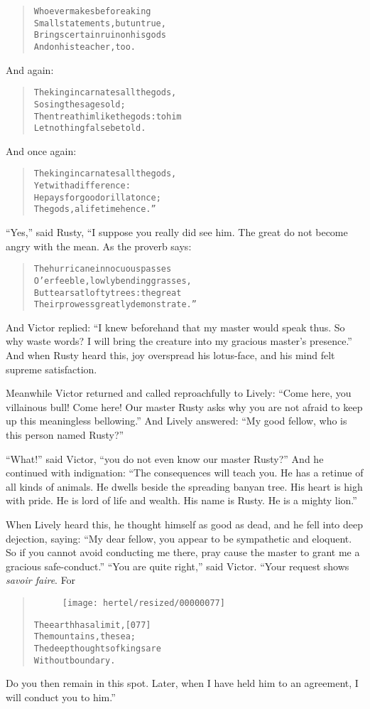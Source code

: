 \documentclass[article, twoside, 10pt]{memoir}
\renewenvironment{verbatim}{%
\begin{quote}%
\vskip -10pt%
\begin{alltt}\normalfont\small}{\end{alltt}%
\end{quote}%
\vskip -10pt
} %
\begin{document}
\begin{verbatim}
Whoever makes before a king
    Small statements, but untrue,
Brings certain ruin on his gods
    And on his teacher, too.
\end{verbatim}
And again:

\begin{verbatim}
The king incarnates all the gods,
    So sing the sages old;
Then treat him like the gods: to him
    Let nothing false be told.
\end{verbatim}
And once again:

\begin{verbatim}
The king incarnates all the gods,
    Yet with a difference:
He pays for good or ill at once;
    The gods, a lifetime hence.”
\end{verbatim}
``Yes,'' said Rusty, “I suppose you really did see him. The great
do not become angry with the mean. As the proverb says:

\begin{verbatim}
The hurricane innocuous passes
O'er feeble, lowly bending grasses,
But tears at lofty trees: the great
Their prowess greatly demonstrate.”
\end{verbatim}
And Victor replied:
``I knew beforehand that my master would speak thus. So why waste words? I will bring the creature into my gracious master's presence.''
And when Rusty heard this, joy overspread his lotus-face, and his
mind felt supreme satisfaction.

Meanwhile Victor returned and called reproachfully to Lively:
``Come here, you villainous bull! Come here! Our master Rusty asks why you are not afraid to keep up this meaningless bellowing.''
And Lively answered:
``My good fellow, who is this person named Rusty?''

``What!'' said Victor, ``you do not even know our master Rusty?''
And he continued with indignation:
``The consequences will teach you. He has a retinue of all kinds of animals. He dwells beside the spreading banyan tree. His heart is high with pride. He is lord of life and wealth. His name is Rusty. He is a mighty lion.''

When Lively heard this, he thought himself as good as dead, and he
fell into deep dejection, saying:
``My dear fellow, you appear to be sympathetic and eloquent. So if you cannot avoid conducting me there, pray cause the master to grant me a gracious safe-conduct.''
``You are quite right,'' said Victor. “Your request shows
\emph{savoir faire}. For

\begin{verbatim}
\begin{figure}[p]\texttt{[image: hertel/resized/00000077]}\end{figure}The earth has a limit,                                  [077]
    The mountains, the sea;
The deep thoughts of kings are
    Without boundary.
\end{verbatim}
Do you then remain in this spot. Later, when I have held him to an
agreement, I will conduct you to him.”
\end{document}
